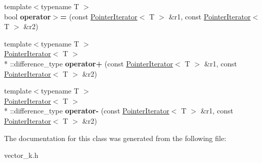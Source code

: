 \begin{DoxyCompactItemize}
\item 
\hypertarget{classkeycpp_1_1_pointer_iterator_a7a58bf216a9bd8b4a4cfd2905a421b8c}{{\footnotesize template$<$typename T $>$ }\\bool {\bfseries operator$>$=} (const \hyperlink{classkeycpp_1_1_pointer_iterator}{Pointer\-Iterator}$<$ T $>$ \&r1, const \hyperlink{classkeycpp_1_1_pointer_iterator}{Pointer\-Iterator}$<$ T $>$ \&r2)}\label{classkeycpp_1_1_pointer_iterator_a7a58bf216a9bd8b4a4cfd2905a421b8c}

\item 
\hypertarget{classkeycpp_1_1_pointer_iterator_a8e7bea4d56f15979b01078c740fc9d33}{{\footnotesize template$<$typename T $>$ }\\\hyperlink{classkeycpp_1_1_pointer_iterator}{Pointer\-Iterator}$<$ T $>$\\*
\-::difference\-\_\-type {\bfseries operator+} (const \hyperlink{classkeycpp_1_1_pointer_iterator}{Pointer\-Iterator}$<$ T $>$ \&r1, const \hyperlink{classkeycpp_1_1_pointer_iterator}{Pointer\-Iterator}$<$ T $>$ \&r2)}\label{classkeycpp_1_1_pointer_iterator_a8e7bea4d56f15979b01078c740fc9d33}

\item 
\hypertarget{classkeycpp_1_1_pointer_iterator_a0c82b8711579ffa15e4ec6f8952e7bda}{{\footnotesize template$<$typename T $>$ }\\\hyperlink{classkeycpp_1_1_pointer_iterator}{Pointer\-Iterator}$<$ T $>$\\*
\-::difference\-\_\-type {\bfseries operator-\/} (const \hyperlink{classkeycpp_1_1_pointer_iterator}{Pointer\-Iterator}$<$ T $>$ \&r1, const \hyperlink{classkeycpp_1_1_pointer_iterator}{Pointer\-Iterator}$<$ T $>$ \&r2)}\label{classkeycpp_1_1_pointer_iterator_a0c82b8711579ffa15e4ec6f8952e7bda}

\end{DoxyCompactItemize}


The documentation for this class was generated from the following file\-:\begin{DoxyCompactItemize}
\item 
vector\-\_\-k.\-h\end{DoxyCompactItemize}
